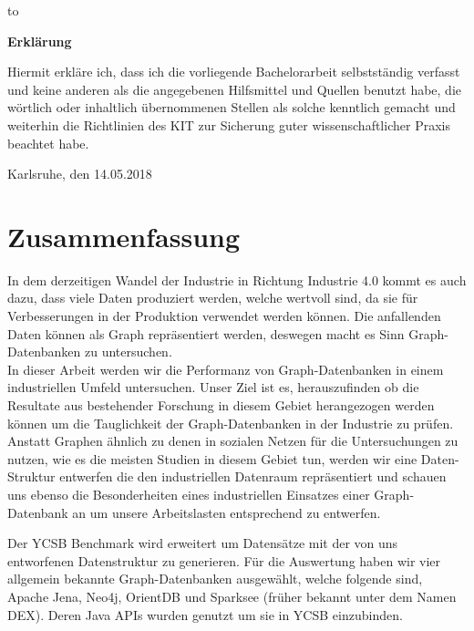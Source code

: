 \thispagestyle{empty}
\vspace*{37\baselineskip}
\hbox to \textwidth{\hrulefill}
\par
\textbf{Erklärung}

Hiermit erkl\"are ich,
dass ich die vorliegende Bachelorarbeit selbstst\"andig verfasst und keine anderen als die angegebenen Hilfsmittel und Quellen benutzt habe,
die w\"ortlich oder inhaltlich \"ubernommenen Stellen als solche kenntlich gemacht und weiterhin die Richtlinien des KIT zur Sicherung guter wissenschaftlicher Praxis beachtet habe.

Karlsruhe, den 14.05.2018

\cleardoublepage


\chapter*{Zusammenfassung}

In dem derzeitigen Wandel der Industrie in Richtung Industrie 4.0 kommt es auch dazu,
dass viele Daten produziert werden,
welche wertvoll sind,
da sie für Verbesserungen in der Produktion verwendet werden können.
Die anfallenden Daten können als Graph repräsentiert werden,
deswegen macht es Sinn Graph-Datenbanken zu untersuchen.\\
In dieser Arbeit werden wir die Performanz von Graph-Datenbanken in einem industriellen Umfeld untersuchen.
Unser Ziel ist es,
herauszufinden ob die Resultate aus bestehender Forschung in diesem Gebiet herangezogen werden können um die Tauglichkeit der Graph-Datenbanken in der Industrie zu prüfen.
Anstatt Graphen ähnlich zu denen in sozialen Netzen für die Untersuchungen zu nutzen,
wie es die meisten Studien in diesem Gebiet tun,
werden wir eine Daten-Struktur entwerfen die den industriellen Datenraum repräsentiert und schauen uns ebenso die Besonderheiten eines industriellen Einsatzes einer Graph-Datenbank an um unsere Arbeitslasten entsprechend zu entwerfen.

Der YCSB Benchmark wird erweitert um Datensätze mit der von uns entworfenen Datenstruktur zu generieren.
Für die Auswertung haben wir vier allgemein bekannte Graph-Datenbanken ausgewählt,
welche folgende sind, Apache Jena, Neo4j, OrientDB und Sparksee (früher bekannt unter dem Namen DEX).
Deren Java APIs wurden genutzt um sie in YCSB einzubinden.

